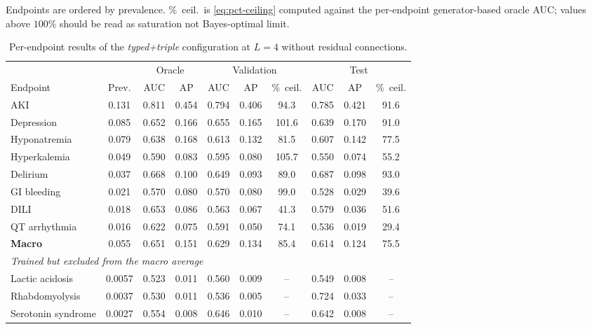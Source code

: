 Endpoints are ordered by prevalence. \%~ceil.\ is
    \eqref{eq:pct-ceiling} computed against the per-endpoint generator-based
    oracle AUC; values above $100\%$ should be read as saturation 
    not 
    Bayes-optimal limit.

    \begin{table}[htbp]
      \centering
      \small
      \setlength{\tabcolsep}{4pt}
      \caption{Per-endpoint results of the \emph{typed+triple} configuration at
        $L=4$ without residual connections.}
      \label{tab:per-endpoint}
      \begin{tabular}{lccc ccc ccc}
        \toprule
        & & \multicolumn{2}{c}{Oracle} & \multicolumn{3}{c}{Validation} & \multicolumn{3}{c}{Test} \\
        \cmidrule(lr){3-4}\cmidrule(lr){5-7}\cmidrule(lr){8-10}
        Endpoint & Prev. & AUC & AP & AUC & AP & \%~ceil. & AUC & AP & \%~ceil. \\
        \midrule
        AKI                & 0.131 & 0.811 & 0.454 & 0.794 & 0.406 & 94.3  & 0.785 & 0.421 & 91.6 \\
        Depression         & 0.085 & 0.652 & 0.166 & 0.655 & 0.165 & 101.6 & 0.639 & 0.170 & 91.0 \\
        Hyponatremia       & 0.079 & 0.638 & 0.168 & 0.613 & 0.132 & 81.5  & 0.607 & 0.142 & 77.5 \\
        Hyperkalemia       & 0.049 & 0.590 & 0.083 & 0.595 & 0.080 & 105.7 & 0.550 & 0.074 & 55.2 \\
        Delirium           & 0.037 & 0.668 & 0.100 & 0.649 & 0.093 & 89.0  & 0.687 & 0.098 & 93.0 \\
        GI bleeding        & 0.021 & 0.570 & 0.080 & 0.570 & 0.080 & 99.0  & 0.528 & 0.029 & 39.6 \\
        DILI               & 0.018 & 0.653 & 0.086 & 0.563 & 0.067 & 41.3  & 0.579 & 0.036 & 51.6 \\
        QT arrhythmia      & 0.016 & 0.622 & 0.075 & 0.591 & 0.050 & 74.1  & 0.536 & 0.019 & 29.4 \\
        \midrule
        \textbf{Macro}     & 0.055 & 0.651 & 0.151 & 0.629 & 0.134 & 85.4  & 0.614 & 0.124 & 75.5 \\
        \midrule
        \multicolumn{10}{l}{\emph{Trained but excluded from the macro average}} \\
        Lactic acidosis    & 0.0057 & 0.523 & 0.011 & 0.560 & 0.009 & {--} & 0.549 & 0.008 & {--} \\
        Rhabdomyolysis     & 0.0037 & 0.530 & 0.011 & 0.536 & 0.005 & {--} & 0.724 & 0.033 & {--} \\
        Serotonin syndrome & 0.0027 & 0.554 & 0.008 & 0.646 & 0.010 & {--} & 0.642 & 0.008 & {--} \\
        \bottomrule
      \end{tabular}
    \end{table}